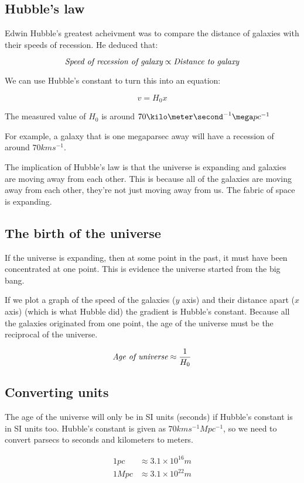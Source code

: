\documentclass{article}
\newcommand{\parsec}{pc}
\begin{document}
\subsection{Hubble's law}

Edwin Hubble's greatest acheivment was to compare the distance of galaxies with
their speeds of recession. He deduced that:

\[
	\textrm{\it Speed of recession of galaxy} \propto 
	\textrm{\it Distance to galaxy}
\]

We can use Hubble's constant to turn this into an equation:

\[
	v = H_0x
\]

The measured value of $H_0$ is around
$70\kilo\meter\second^{-1}\mega\parsec^{-1}$

For example, a galaxy that is one megaparsec away will have a recession of
around $70kms^{-1}$.

The implication of Hubble's law is that the universe is expanding and galaxies
are moving away from each other. This is because all of the galaxies are moving
away from each other, they're not just moving away from us. The fabric of space
is expanding.

\subsection{The birth of the universe}

If the universe is expanding, then at some point in the past, it must have been
concentrated at one point. This is evidence the universe started from the big
bang.

If we plot a graph of the speed of the galaxies ($y$ axis) and their distance
apart ($x$ axis) (which is what Hubble did) the gradient is Hubble's constant.
Because all the galaxies originated from one point, the age of the universe must
be the reciprocal of the universe.

\[
	\textrm{\it Age of universe} \approx \frac{1}{H_0}
\]

\subsection{Converting units}

The age of the universe will only be in SI units (seconds) if Hubble's constant
is in SI units too. Hubble's constant is given as $70kms^{-1}Mpc^{-1}$, so we
need to convert parsecs to seconds and kilometers to meters.

\[
	\begin{split}
		1pc &\approx 3.1\times10^{16}m\\
		1Mpc &\approx 3.1\times10^{22}m\\
	\end{split}
\]
\end{document}
